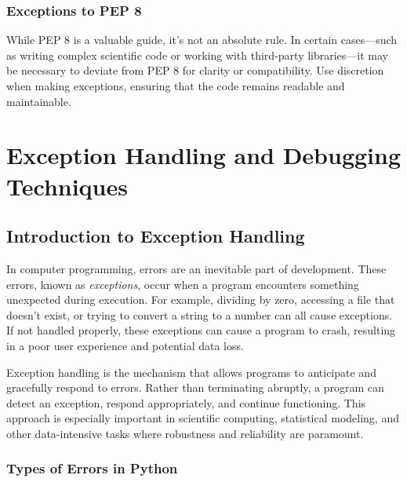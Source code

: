 \documentclass[
  letterpaper,
  DIV=11,
  numbers=noendperiod]{scrreprt}
\begin{document}
\hypertarget{exceptions-to-pep-8}{%
\subsection{Exceptions to PEP 8}\label{exceptions-to-pep-8}}

While PEP 8 is a valuable guide, it's not an absolute rule. In certain
cases---such as writing complex scientific code or working with
third-party libraries---it may be necessary to deviate from PEP 8 for
clarity or compatibility. Use discretion when making exceptions,
ensuring that the code remains readable and maintainable.


\hypertarget{sec-exception}{%
\chapter{Exception Handling and Debugging
Techniques}\label{sec-exception}}

\hypertarget{introduction-to-exception-handling}{%
\section{Introduction to Exception
Handling}\label{introduction-to-exception-handling}}

In computer programming, errors are an inevitable part of development.
These errors, known as \emph{exceptions}, occur when a program
encounters something unexpected during execution. For example, dividing
by zero, accessing a file that doesn't exist, or trying to convert a
string to a number can all cause exceptions. If not handled properly,
these exceptions can cause a program to crash, resulting in a poor user
experience and potential data loss.

Exception handling is the mechanism that allows programs to anticipate
and gracefully respond to errors. Rather than terminating abruptly, a
program can detect an exception, respond appropriately, and continue
functioning. This approach is especially important in scientific
computing, statistical modeling, and other data-intensive tasks where
robustness and reliability are paramount.

\hypertarget{types-of-errors-in-python}{%
\subsection{Types of Errors in Python}\label{types-of-errors-in-python}}
\end{document}
